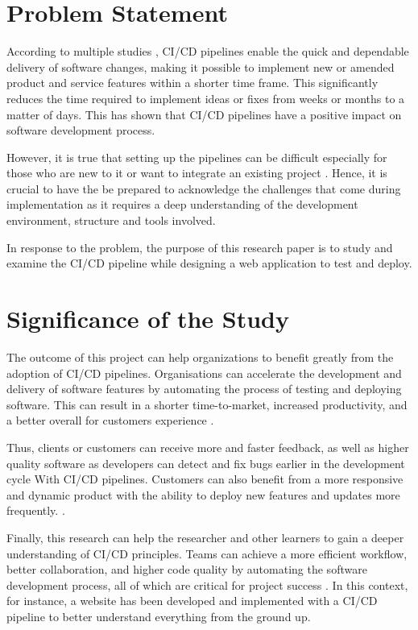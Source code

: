 \section{Problem Statement}
According to multiple studies \cite{sb, saz, chen, dm, saarenpaa2020creating}, CI/CD pipelines enable the quick and dependable delivery of software changes, making it possible to implement new or amended product and service features within a shorter time frame. This significantly reduces the time required to implement ideas or fixes from weeks or months to a matter of days. This has shown that CI/CD pipelines have a positive impact on software development process.

However, it is true that setting up the pipelines can be difficult especially for those who are new to it or want to integrate an existing project \cite{sander}. Hence, it is crucial to have the be prepared to acknowledge the challenges that come during implementation as it requires a deep understanding of the development environment, structure and tools involved.

In response to the problem, the purpose of this research paper is to study and examine the CI/CD pipeline while designing a web application to test and deploy.

\section{Significance of the Study}
The outcome of this project can help organizations to benefit greatly from the adoption of CI/CD pipelines. Organisations can accelerate the development and delivery of software features by automating the process of testing and deploying software. This can result in a shorter time-to-market, increased productivity, and a better overall for customers experience \cite{hf}.

Thus, clients or customers can receive more and faster feedback, as well as higher quality software as developers can detect and fix bugs earlier in the development cycle With CI/CD pipelines. Customers can also benefit from a more responsive and dynamic product with the ability to deploy new features and updates more frequently. \cite{chen, leppanenetal}.

Finally, this research can help the researcher and other learners to gain a deeper understanding of CI/CD principles. Teams can achieve a more efficient workflow, better collaboration, and higher code quality by automating the software development process, all of which are critical for project success \cite{sander}. In this context, for instance, a website has been developed and implemented with a CI/CD pipeline to better understand everything from the ground up.

